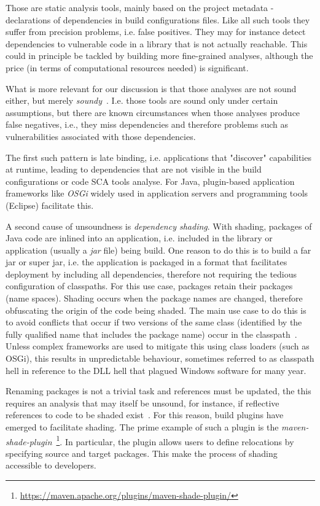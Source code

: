 \documentclass{article}
\begin{document}
 Those are static analysis tools, mainly based on the project metadata - declarations of dependencies in build configurations files. Like all such tools they suffer from precision problems, i.e. false positives. They may for instance detect dependencies to vulnerable code in a  library that is not actually reachable. This could in principle be tackled by building more fine-grained analyses, although the price (in terms of computational resources needed) is significant. 
 
What is more  relevant for our discussion  is that those analyses are not sound either, but merely \textit{soundy}~\cite{livshits2015defense}. I.e. those tools are sound only under certain assumptions, but there are known circumstances when those analyses produce false negatives, i.e., they miss dependencies and therefore problems such as vulnerabilities associated with those dependencies.
 
 The first such pattern is late binding, i.e. applications that "discover" capabilities at runtime, leading to dependencies that are not visible in the build configurations or code SCA tools analyse.  For Java, plugin-based application frameworks like \textit{OSGi} widely used in application servers and programming tools (Eclipse) facilitate this.  
 
 A second cause of unsoundness is \textit{dependency shading}.  With shading, packages of Java code are inlined into an application, i.e. included in the library or application (usually a \textit{jar} file) being build. One reason to do this is to build a far jar or super jar, i.e. the application is packaged in a format that facilitates deployment by including all dependencies, therefore not requiring the tedious configuration of classpaths. For this use case, packages retain their packages (name spaces). Shading occurs when the package names are changed, therefore obfuscating the origin of the code being shaded. The main use case to do this is to avoid conflicts that occur if two versions of the same class (identified by the fully qualified name that includes the package name) occur in the classpath~\cite{wang2018dependency}. Unless complex frameworks are used to mitigate this using class loaders (such as OSGi), this results in unpredictable behaviour, sometimes referred to as classpath hell in reference to the DLL hell that plagued Windows software for many year. 
 
 Renaming packages is not a trivial task and references must be updated, the this requires an analysis that may itself be unsound, for instance, if reflective references to code to be shaded exist~\cite{sui2020recall}. For this reason, build plugins have emerged to facilitate shading. The prime example of such a plugin is the \textit{maven-shade-plugin}~\footnote{\url{https://maven.apache.org/plugins/maven-shade-plugin/}}. In particular, the plugin allows users to define relocations by specifying source and target packages. This make the process of shading accessible to developers.  
 
\end{document}
